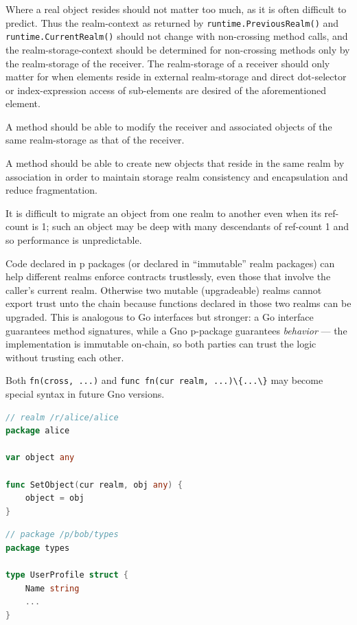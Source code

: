 \documentclass[12pt,a4paper]{article}
\newcommand{\passthrough}[1]{#1}
\begin{document}
Where a real object resides should not matter too much, as it is often
difficult to predict. Thus the realm-context as returned by
\passthrough{\lstinline!runtime.PreviousRealm()!} and
\passthrough{\lstinline!runtime.CurrentRealm()!} should not change with
non-crossing method calls, and the realm-storage-context should be
determined for non-crossing methods only by the realm-storage of the
receiver. The realm-storage of a receiver should only matter for when
elements reside in external realm-storage and direct dot-selector or
index-expression access of sub-elements are desired of the
aforementioned element.

A method should be able to modify the receiver and associated objects of
the same realm-storage as that of the receiver.

A method should be able to create new objects that reside in the same
realm by association in order to maintain storage realm consistency and
encapsulation and reduce fragmentation.

It is difficult to migrate an object from one realm to another even when
its ref-count is 1; such an object may be deep with many descendants of
ref-count 1 and so performance is unpredictable.

Code declared in p packages (or declared in ``immutable'' realm
packages) can help different realms enforce contracts trustlessly, even
those that involve the caller's current realm. Otherwise two mutable
(upgradeable) realms cannot export trust unto the chain because
functions declared in those two realms can be upgraded. This is
analogous to Go interfaces but stronger: a Go interface guarantees
method signatures, while a Gno p-package guarantees \emph{behavior} ---
the implementation is immutable on-chain, so both parties can trust the
logic without trusting each other.

Both \passthrough{\lstinline!fn(cross, ...)!} and
\passthrough{\lstinline!func fn(cur realm, ...)\{...\}!} may become
special syntax in future Gno versions.

\begin{lstlisting}[language=Go]
// realm /r/alice/alice
package alice

var object any

func SetObject(cur realm, obj any) {
    object = obj
}
\end{lstlisting}

\begin{lstlisting}[language=Go]
// package /p/bob/types
package types

type UserProfile struct {
    Name string
    ...
}
\end{lstlisting}
\end{document}
